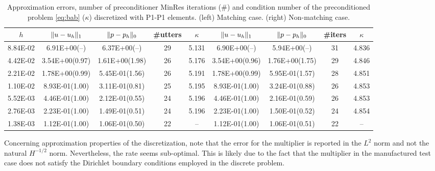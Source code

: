 \documentclass[r]{siamart171218}
\begin{document}
\begin{table}
  \begin{center}
    \footnotesize{
  \begin{tabular}{c|cc|c|c||cc|c|c}
    \hline
    $h$ & $\lVert{u-u_h}\rVert_1$ & $\lVert{p-p_h}\rVert_0$ & \#{utters} & $\kappa$
        & $\lVert{u-u_h}\rVert_1$ & $\lVert{p-p_h}\rVert_0$ & \#{iters} & $\kappa$ \\
    \hline
8.84E-02 & 6.91E+00(--)   & 6.37E+00(--)   & 29 & 5.131 & 6.90E+00(--)  & 5.94E+00(--)    & 31 & 4.836\\
4.42E-02 & 3.54E+00(0.97) & 1.61E+00(1.98) & 26 & 5.176 & 3.54E+00(0.96) & 1.76E+00(1.75) & 29 & 4.846\\
2.21E-02 & 1.78E+00(0.99) & 5.45E-01(1.56) & 26 & 5.191 & 1.78E+00(0.99) & 5.95E-01(1.57) & 28 & 4.851\\
1.10E-02 & 8.93E-01(1.00) & 3.11E-01(0.81) & 25 & 5.195 & 8.93E-01(1.00) & 3.24E-01(0.88) & 26 & 4.853\\
5.52E-03 & 4.46E-01(1.00) & 2.12E-01(0.55) & 24 & 5.196 & 4.46E-01(1.00) & 2.16E-01(0.59) & 26 & 4.853\\
2.76E-03 & 2.23E-01(1.00) & 1.49E-01(0.51) & 24 & 5.196 & 2.23E-01(1.00) & 1.50E-01(0.52) & 24 & 4.854\\
1.38E-03 & 1.12E-01(1.00) & 1.06E-01(0.50) & 22 & --    & 1.12E-01(1.00) & 1.06E-01(0.51) & 22 & --   \\
    \hline
  \end{tabular}
  }
    \caption{Approximation errors, number of preconditioner MinRes iterations (\#) and
      condition number of the preconditioned problem \eqref{eq:bab} ($\kappa$) discretized
      with P1-P1 elements. (left) Matching case. (right) Non-matching case.}
  \label{tab:p1_p1}
  \end{center}
\end{table}
%
Concerning approximation properties of the discretization, note that the error
for the multiplier is reported in the $L^2$ norm and not the natural $H^{-1/2}$
norm. Nevertheless, the rate seems sub-optimal. This is likely due to the fact
that the multiplier in the manufactured test case does not satisfy the
Dirichlet boundary conditions employed in the discrete problem.
\end{document}
